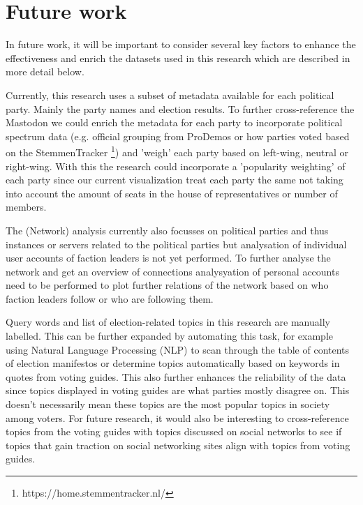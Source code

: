 \section{Future work}

In future work, it will be important to consider several key factors to enhance the effectiveness and enrich the datasets used in this research which are described in more detail below.

Currently, this research uses a subset of metadata available for each political party. Mainly the party names and election results. To further cross-reference the Mastodon we could enrich the metadata for each party to incorporate political spectrum data (e.g. official grouping from ProDemos or how parties voted based on the StemmenTracker \footnote{https://home.stemmentracker.nl/}) and 'weigh' each party based on left-wing, neutral or right-wing. With this the research could incorporate a 'popularity weighting' of each party since our current visualization treat each party the same not taking into account the amount of seats in the house of representatives or number of members.

The (Network) analysis currently also focusses on political parties and thus instances or servers related to the political parties but analysation of individual user accounts of faction leaders is not yet performed. To further analyse the network and get an overview of connections analysyation of personal accounts need to be performed to plot further relations of the network based on who faction leaders follow or who are following them.

Query words and list of election-related topics in this research are manually labelled. This can be further expanded by automating this task, for example using Natural Language Processing (NLP) to scan through the table of contents of election manifestos or determine topics automatically based on keywords in quotes from voting guides. This also further enhances the reliability of the data since topics displayed in voting guides are what parties mostly disagree on. This doesn't necessarily mean these topics are the most popular topics in society among voters. For future research, it would also be interesting to cross-reference topics from the voting guides with topics discussed on social networks to see if topics that gain traction on social networking sites align with topics from voting guides.
